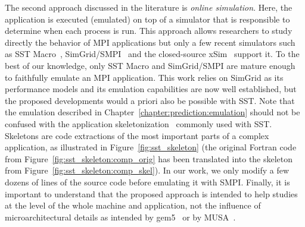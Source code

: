         The second approach discussed in the literature is \emph{online simulation}.  Here, the application is executed
        (emulated) on top of a simulator that is responsible to determine when each process is run. This approach allows
        researchers to study directly the behavior of MPI applications but only a few recent simulators such as SST
        Macro~\cite{sstmacro}, SimGrid/SMPI~\cite{simgrid} and the closed-source xSim~\cite{xsim} support it. To the
        best of our knowledge, only SST Macro and SimGrid/SMPI are mature enough to faithfully emulate an MPI
        application.  This work relies on SimGrid as its performance models and its emulation capabilities are now well
        established, but the proposed developments would a priori also be possible with SST.  Note that the emulation
        described in Chapter~\ref{chapter:prediction:emulation} should not be confused with the application
        skeletonization~\cite{sst_skeleton} commonly used with SST. Skeletons are code extractions of the most important
        parts of a complex application, as illustrated in Figure~\ref{fig:sst_skeleton} (\eg the original Fortran code
        from Figure~\ref{fig:sst_skeleton:comp_orig} has been translated into the skeleton from
        Figure~\ref{fig:sst_skeleton:comp_skel}). In our work, we only modify a few dozens of lines of the source code
        before emulating it with SMPI.  Finally, it is important to understand that the proposed approach is intended to
        help studies at the level of the whole machine and application, not the influence of microarchitectural details
        as intended by gem5~\cite{lowepower2020gem5} or by MUSA~\cite{musa_16}.

